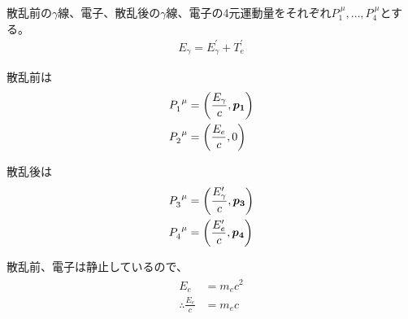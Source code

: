 \documentclass[../../main.tex]{subfiles}
\numberwithin{equation}{section}
\numberwithin{table}{section}
\numberwithin{figure}{section}
\begin{document}



	




散乱前の$\gamma$線、電子、散乱後の$\gamma$線、電子の4元運動量をそれぞれ$P^{\ \mu}_1,\dots,P^{\ \mu}_4$とする。
\begin{align}
E_{\gamma}=E_{\gamma}^{\prime}+T_e^{\prime}
\end{align}

散乱前は
\begin{align}
\begin{split}  
P^{\ \mu}_1&=\qty(\frac{E_{\gamma}}{c},\bm{p_1})\\
P^{\ \mu}_2&=\qty(\frac{E_{e}}{c},0)
\end{split}
\end{align}

散乱後は
\begin{align}
\begin{split} 
P^{\ \mu}_3&=\qty(\frac{E_{\gamma}^{\prime}}{c},\bm{p_3})\\
P^{\ \mu}_4&=\qty(\frac{E_{e}^{\prime}}{c},\bm{p_4})\label{p2}
\end{split}
\end{align}

散乱前、電子は静止しているので、 
\begin{align}
\begin{split}
E_e&=m_ec^2\\
\therefore \frac{E_e}{c}&=m_ec
\end{split}
\end{align}
\end{document}
